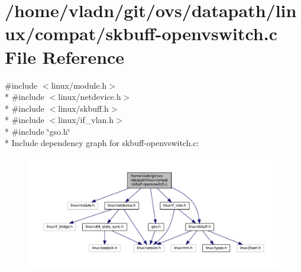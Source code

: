 \hypertarget{compat_2skbuff-openvswitch_8c}{}\section{/home/vladn/git/ovs/datapath/linux/compat/skbuff-\/openvswitch.c File Reference}
\label{compat_2skbuff-openvswitch_8c}
{\ttfamily \#include $<$linux/module.\+h$>$}\\*
{\ttfamily \#include $<$linux/netdevice.\+h$>$}\\*
{\ttfamily \#include $<$linux/skbuff.\+h$>$}\\*
{\ttfamily \#include $<$linux/if\+\_\+vlan.\+h$>$}\\*
{\ttfamily \#include \char`\"{}gso.\+h\char`\"{}}\\*
Include dependency graph for skbuff-\/openvswitch.c\+:
\nopagebreak
\begin{figure}[H]
\begin{center}
\leavevmode
\includegraphics[width=350pt]{compat_2skbuff-openvswitch_8c__incl}
\end{center}
\end{figure}

